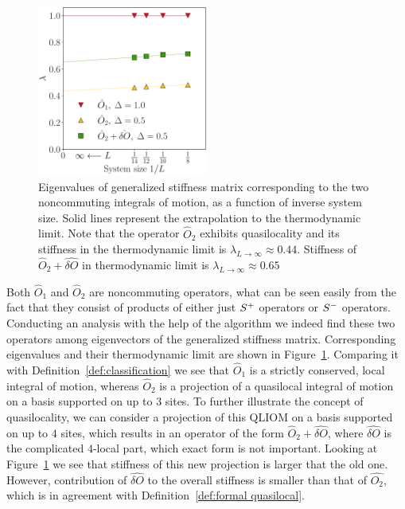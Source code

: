 \begin{figure}[htbp]
  \centering
  \includegraphics[width=0.5\textwidth]{Figures/nocomm_int.pdf}
  \caption{Eigenvalues of generalized stiffness matrix corresponding to the two noncommuting
    integrals of motion, as a function of inverse system size. Solid lines represent the extrapolation
    to the thermodynamic limit. Note that the operator \(\hat{O}_2\) exhibits quasilocality
    and its stiffness in the thermodynamic limit is \(\lambda_{L\to\infty} \approx
    0.44\). Stiffness of \(\hat{O}_2 + \hat{\delta O}\) in thermodynamic limit is
    \(\lambda_{L\to\infty} \approx 0.65\)}
  \label{fig: noncommuting integrable}
\end{figure}

Both \(\hat{O}_1\) and \(\hat{O}_2\) are noncommuting operators, what can be seen easily from the
fact that they consist of products of either just \(S^{+}\) operators or \(S^{-}\) operators. Conducting
an analysis with the help of the algorithm we indeed find these two operators among eigenvectors
of the generalized stiffness matrix. Corresponding eigenvalues and their thermodynamic limit
are shown in Figure~\ref{fig: noncommuting integrable}. Comparing it with 
Definition~\ref{def:classification} we see that \(\hat{O}_1\) is a strictly 
conserved, local integral of motion, whereas \(\hat{O}_2\) is a projection 
of a quasilocal integral of motion on a basis supported on up to \(3\) sites.
To further illustrate the concept of quasilocality, we can consider a projection
of this QLIOM on a basis supported on up to \(4\) sites, which results in an operator of the form 
\(\hat{O}_2 + \hat{\delta O}\), where \(\hat{\delta O}\) is the complicated \(4\)-local part,
which exact form is not important. Looking at Figure~\ref{fig: noncommuting integrable} we see
that stiffness of this new projection is larger that the old one. However, contribution 
of \(\hat{\delta O}\) to the overall stiffness is smaller than that of \(\hat{O_2}\), which
is in agreement with Definition~\ref{def:formal quasilocal}.
